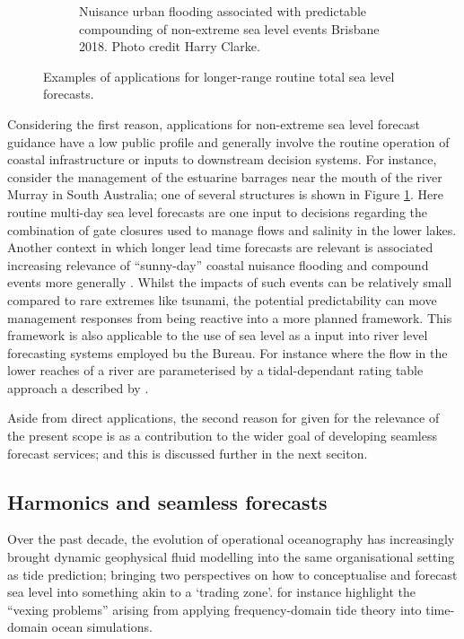 \begin{figure}[H]
\begin{subfigure}[t]{\figwidthHalf}
      \caption{Nuisance urban flooding associated with predictable compounding of non-extreme sea level events Brisbane 2018. Photo credit Harry Clarke.}
  \end{subfigure}
  \caption{Examples of applications for longer-range routine total sea level forecasts.} 
  \label{fig:applicationPhotos}
\end{figure}


Considering the first reason, applications for non-extreme sea level forecast guidance have a low public profile and generally involve the routine operation of coastal infrastructure or inputs to downstream decision systems.
For instance, consider the management of the estuarine barrages near the mouth of the river Murray in South Australia; one of several structures is shown in Figure \ref{fig:applicationPhotos}.  Here routine multi-day sea level forecasts are one input to decisions regarding the combination of gate closures used to manage flows and salinity in the lower lakes.  
Another context in which longer lead time forecasts are relevant is associated increasing relevance of ``sunny-day'' coastal nuisance flooding \citep{10.1007/s11069-021-04600-4} and compound events more generally \citep{McInnes:2016km}.   Whilst the impacts of such events can be relatively small compared to rare extremes like tsunami, the potential predictability can move  management responses from being reactive into a more planned framework.   
This framework is also applicable to the use of sea level as a input into river level forecasting systems employed bu the Bureau.  For instance where the flow in the lower reaches of a river are parameterised by a tidal-dependant rating table approach a described by \citet{Leahy:2007tx}.


Aside from direct applications, the second reason for given for the relevance of the present scope is as a contribution to the wider goal of developing seamless forecast services; and this is discussed further in the next seciton. 

\subsection{Harmonics and seamless forecasts}
\label{sec:concrete}
Over the past decade, the evolution of operational oceanography has increasingly brought dynamic geophysical fluid modelling into the same organisational setting as tide prediction\citep{10.1080/1755876x.2019.1685834};  bringing two perspectives on how to conceptualise and forecast sea level into something akin to a \citet{Galison:1996uc} `trading zone'.  \citet{Jayne:2001tr} for instance highlight the ``vexing problems'' arising from applying frequency-domain tide theory into time-domain ocean simulations.


